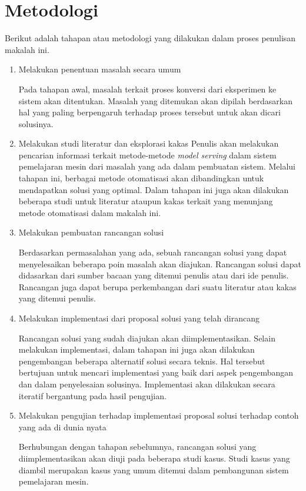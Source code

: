 \section{Metodologi}

Berikut adalah tahapan atau metodologi yang dilakukan dalam proses penulisan makalah ini.

\begin{enumerate}
  \item Melakukan penentuan masalah secara umum
  
  Pada tahapan awal, masalah terkait proses konversi dari eksperimen ke sistem akan ditentukan.
  Masalah yang ditemukan akan dipilah berdasarkan hal yang paling berpengaruh terhadap proses tersebut untuk akan dicari solusinya.

  \item Melakukan studi literatur dan eksplorasi kakas
  Penulis akan melakukan pencarian informasi terkait metode-metode \textit{model serving} dalam sistem pemelajaran mesin dari masalah yang ada dalam pembuatan sistem.
  Melalui tahapan ini, berbagai metode otomatisasi akan dibandingkan untuk mendapatkan solusi yang optimal.
  Dalam tahapan ini juga akan dilakukan beberapa studi untuk literatur ataupun kakas terkait yang menunjang metode otomatisasi dalam makalah ini.

  \item Melakukan pembuatan rancangan solusi
  
  Berdasarkan permasalahan yang ada, sebuah rancangan solusi yang dapat menyelesaikan beberapa poin masalah akan diajukan.
  Rancangan solusi dapat didasarkan dari sumber bacaan yang ditemui penulis atau dari ide penulis.
  Rancangan juga dapat berupa perkembangan dari suatu literatur atau kakas yang ditemui penulis.

  \item Melakukan implementasi dari proposal solusi yang telah dirancang
  
  Rancangan solusi yang sudah diajukan akan diimplementasikan.
  Selain melakukan implementasi, dalam tahapan ini juga akan dilakukan pengembangan beberapa alternatif solusi secara teknis.
  Hal tersebut bertujuan untuk mencari implementasi yang baik dari aspek pengembangan dan dalam penyelesaian solusinya.
  Implementasi akan dilakukan secara iteratif bergantung pada hasil pengujian.

  \item Melakukan pengujian terhadap implementasi proposal solusi terhadap contoh yang ada di dunia nyata
  
  Berhubungan dengan tahapan sebelumnya, rancangan solusi yang diimplementasikan akan diuji pada beberapa studi kasus.
  Studi kasus yang diambil merupakan kasus yang umum ditemui dalam pembangunan sistem pemelajaran mesin.
  
\end{enumerate}